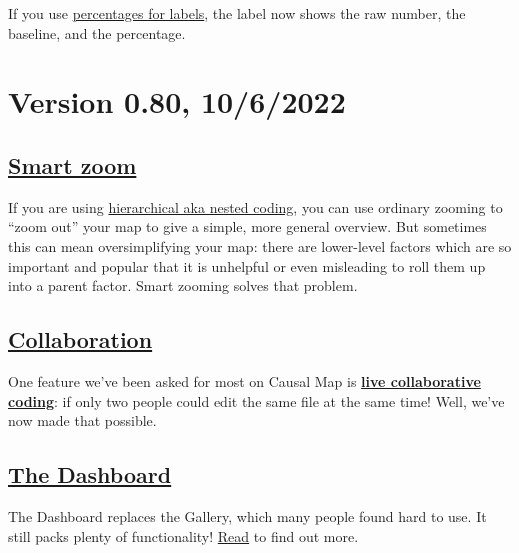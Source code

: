 \documentclass[
]{book}
\begin{document}
If you use \protect\hyperlink{percent}{percentages for labels}, the label now shows the raw number, the baseline, and the percentage.

\hypertarget{version-0.80-1062022}{%
\section{Version 0.80, 10/6/2022}\label{version-0.80-1062022}}

\hypertarget{smart-zoom-1}{%
\subsection{\texorpdfstring{\protect\hyperlink{smart-zoom}{Smart zoom}}{Smart zoom}}\label{smart-zoom-1}}

If you are using \protect\hyperlink{xsimplifying-with-hierarchical}{hierarchical aka nested coding}, you can use ordinary zooming to ``zoom out'' your map to give a simple, more general overview. But sometimes this can mean oversimplifying your map: there are lower-level factors which are so important and popular that it is unhelpful or even misleading to roll them up into a parent factor. Smart zooming solves that problem.

\hypertarget{collaboration}{%
\subsection{\texorpdfstring{\protect\hyperlink{ux5cux23collaboration}{Collaboration}}{Collaboration}}\label{collaboration}}

One feature we've been asked for most on Causal Map is \textbf{\href{https://guide.causalmap.app/collaborating-at-causal-map.html\#details}{live collaborative coding}}: if only two people could edit the same file at the same time! Well, we've now made that possible.

\hypertarget{the-dashboard}{%
\subsection{\texorpdfstring{\protect\hyperlink{dashboard}{The Dashboard}}{The Dashboard}}\label{the-dashboard}}

The Dashboard replaces the Gallery, which many people found hard to use. It still packs plenty of functionality! \protect\hyperlink{dashboard}{Read} to find out more.
\end{document}
